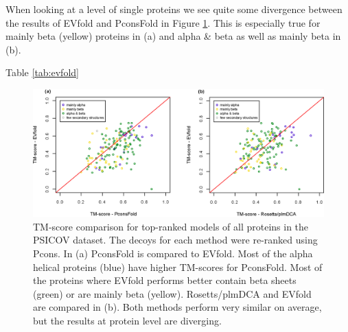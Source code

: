 \documentclass{bioinfo}
\begin{document}
When looking at a level of single proteins we see quite some divergence between the results of EVfold and PconsFold in Figure \ref{fig:vs}. This is especially true for mainly beta (yellow) proteins in (a) and alpha \& beta as well as mainly beta in (b). 


Table \ref{tab:evfold} 


\begin{figure}[!tpb]%
\centerline{\includegraphics[scale=0.7]{figures/vs.eps}}
\caption{TM-score comparison for top-ranked models of all proteins in the PSICOV dataset. The decoys for each method were re-ranked using Pcons. In (a) PconsFold is compared to EVfold. Most of the alpha helical proteins (blue) have higher TM-scores for PconsFold. Most of the proteins where EVfold performs better contain beta sheets (green) or are mainly beta (yellow). Rosetts/plmDCA and EVfold are compared in (b). Both methods perform very similar on average, but the results at protein level are diverging.}\label{fig:vs}
\end{figure}
\end{document}
